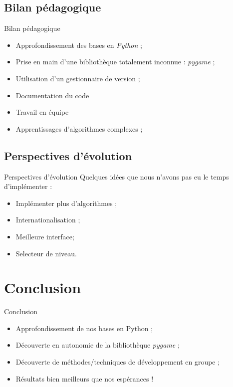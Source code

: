 \documentclass{beamer}
\begin{document}
\subsection{Bilan pédagogique}
	\begin{frame}{Bilan pédagogique}
		\begin{itemize}
		\setlength{\itemsep}{0.3cm}
			\item Approfondissement des bases en \emph{Python} ;
			\item Prise en main d'une bibliothèque totalement inconnue :
			\emph{pygame} ;
			\vspace{1cm}
			\item Utilisation d'un gestionnaire de version ;
			\item Documentation du code
			\item Travail en équipe
            \item Apprentissages d'algorithmes complexes ;
		\end{itemize}
	\end{frame}
\subsection{Perspectives d'évolution}
	\begin{frame}{Perspectives d'évolution}
		Quelques idées que nous n'avons pas eu le temps d'implémenter :
		\begin{itemize}
		\setlength{\itemsep}{0.3cm}
			\item Implémenter plus d'algorithmes ;
			\item Internationalisation ;
			\item Meilleure interface;
            \item Selecteur de niveau.
		\end{itemize}
	\end{frame}

\section{Conclusion}
	\begin{frame}{Conclusion}
		\begin{itemize}
		\setlength{\itemsep}{0.4cm}
			\item Approfondissement de nos bases en Python ;
			\item Découverte en autonomie de la bibliothèque \emph{pygame} ;
			\item Découverte de méthodes/techniques de développement en groupe ;
			\item Résultats bien meilleurs que nos espérances !
		\end{itemize}
	\end{frame}
\end{document}
